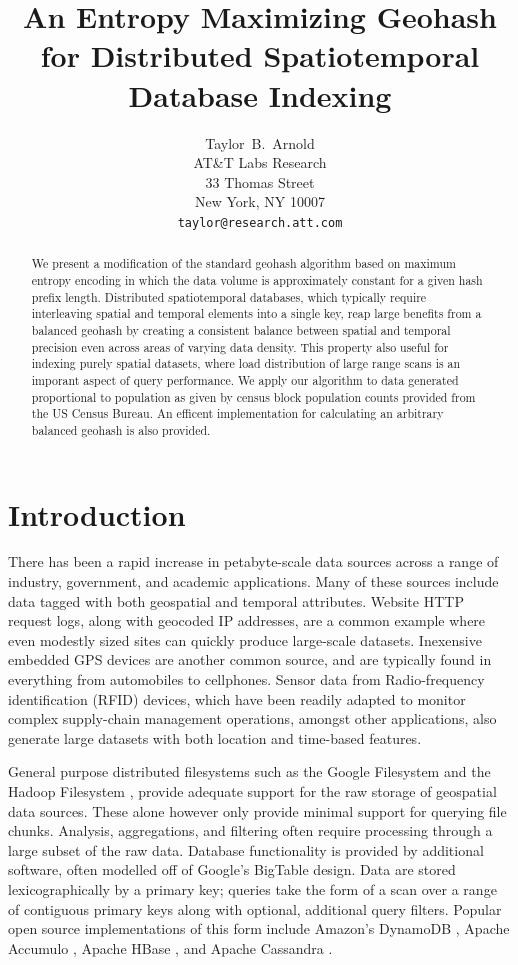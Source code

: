 \documentclass[nips13submit_09,times,art10]{article} %
\title{An Entropy Maximizing Geohash for Distributed Spatiotemporal Database Indexing}
\author{
Taylor~B.~Arnold \\
AT\&T Labs Research\\
33 Thomas Street\\
New York, NY 10007 \\
\texttt{taylor@research.att.com}
}
\begin{document}
\maketitle

\begin{abstract}
We present a modification of the standard geohash algorithm
based on maximum entropy encoding in which the data volume
is approximately constant for a given hash prefix length.
Distributed spatiotemporal databases, which typically require interleaving
spatial and temporal elements into a single key, reap large benefits
from a balanced geohash by creating a consistent balance between spatial
and temporal precision even across areas of varying data density.
This property also useful for indexing purely spatial datasets,
where load distribution of large range scans is an imporant aspect
of query performance.  We apply our algorithm to data generated
proportional to population as given by census block population
counts provided from the US Census Bureau. An efficent implementation
for calculating an arbitrary balanced geohash is also provided.
\end{abstract}

\section{Introduction}  \label{sec:intro}

There has been a rapid increase in petabyte-scale data sources across
a range of industry, government, and academic applications. Many of
these sources include data tagged with both geospatial and temporal
attributes. Website HTTP request logs, along with geocoded IP addresses,
are a common example where even modestly sized sites can quickly produce
large-scale datasets. Inexensive embedded GPS devices are another common
source, and are typically found in everything from automobiles to cellphones.
Sensor data from Radio-frequency identification (RFID) devices, which have
been readily adapted to monitor complex supply-chain management operations,
amongst other applications, also generate large datasets with both location
and time-based features.

General purpose distributed filesystems such as the Google Filesystem \cite{ghemawat2003google}
and the Hadoop Filesystem \cite{shvachko2010hadoop}, provide adequate
support for the raw storage of geospatial data sources. These alone however only
provide minimal support for querying file chunks. Analysis, aggregations, and filtering
often require processing through a large subset of the raw data. Database functionality
is provided by additional software, often modelled off of Google's
BigTable \cite{chang2008bigtable} design. Data are stored lexicographically
by a primary key; queries take the form of a scan over a range of contiguous
primary keys along with optional, additional query filters.
Popular open source implementations of this form include Amazon's DynamoDB \cite{decandia2007dynamo},
Apache Accumulo \cite{fuchs2012accumulo}, Apache HBase \cite{taylor2010overview},
and Apache Cassandra \cite{lakshman2010cassandra}.
\end{document}

